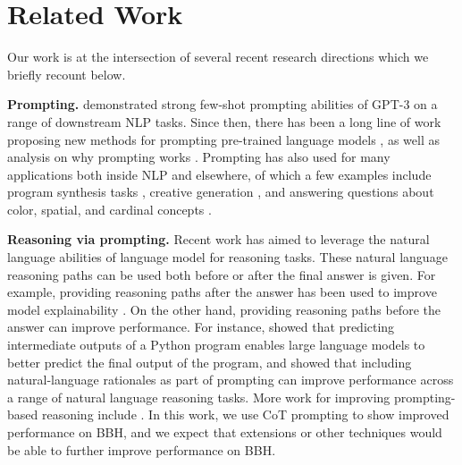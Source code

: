 \section{Related Work}
\label{sec:related_work}

Our work is at the intersection of several recent research directions which we briefly recount below.

\textbf{Prompting.} 
\citet{brown2020language} demonstrated strong few-shot prompting abilities of GPT-3 on a range of downstream NLP tasks. Since then, there has been a long line of work proposing new methods for prompting pre-trained language models \citep[][\textit{inter alia}]{schick2021exploiting,perez2021true,lester2021power}, as well as analysis on why prompting works \citep[][\textit{inter alia}]{zhao2021calibrate,xie2021incontext,webson2021prompt,min2022rethinking}. Prompting has also used for many applications both inside NLP and elsewhere, of which a few examples include program synthesis tasks \citep{chen2021evaluating,austin2021program,li2022competition}, creative generation \citep{reif2022recipe,suzgun2022prompt,mittal2022ambipun}, and answering questions about color, spatial, and cardinal concepts \citep{abdou2021can,patel2022mapping}.

\textbf{Reasoning via prompting.} Recent work has aimed to leverage the natural language abilities of language model for reasoning tasks. These natural language reasoning paths can be used both before or after the final answer is given. For example, providing reasoning paths after the answer has been used to improve model explainability \citep{zhou2020towards,stacey2021natural,Marasovi2022FewShotSW,mishra2022cross,hase-bansal-2022-models,wiegreffe-etal-2022-reframing,lampinen2022can}. On the other hand, providing reasoning paths before the answer can improve performance. For instance, \citet{nye2021show} showed that predicting intermediate outputs of a Python program  enables large language models to better predict the final output of the program, and \citet{wei2022chain} showed that including natural-language rationales as part of prompting can improve performance across a range of natural language reasoning tasks. More work for improving prompting-based reasoning include \cite[][\textit{inter alia}]{wang2022self,zhou2022least,li2022advance, creswell2022selection, madaan2022text,drozdov2022compositional, cheng2022binding,chen2022largel}. In this work, we use CoT prompting to show improved performance on BBH, and we expect that extensions or other techniques would be able to further improve performance on BBH.

